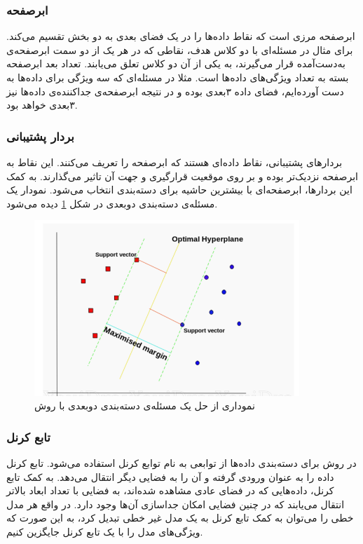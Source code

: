 \subsubsection{ابرصفحه}
ابرصفحه مرزی است که نقاط داده‌ها را در یک فضای بعدی به دو بخش تقسیم می‌کند. برای مثال در مسئله‌ای با دو کلاس هدف، نقاطی که در هر یک از دو سمت ابرصفحه‌ی به‌دست‌آمده قرار می‌گیرند، به یکی از آن دو کلاس تعلق می‌یابند. تعداد بعد ابرصفحه بسته به تعداد ویژگی‌های داده‌ها است. مثلا در مسئله‌ای که سه ویژگی برای داده‌ها به دست آورده‌ایم، فضای داده ۳بعدی بوده و در نتیجه ابرصفحه‌ی جداکننده‌ی داده‌ها نیز ۳بعدی خواهد بود.

\subsubsection{بردار پشتیبانی}
بردارهای پشتیبانی، نقاط داده‌ای هستند که ابرصفحه را تعریف می‌کنند. این نقاط به ابرصفحه نزدیک‌تر بوده و بر روی موقعیت قرارگیری و جهت آن تاثیر می‌گذارند. به کمک این بردارها، ابرصفحه‌ای با بیشترین حاشیه برای دسته‌بندی انتخاب می‌شود\cite{SVM}. نمودار یک مسئله‌ی دسته‌بندی دوبعدی در شکل \ref{fig:SVMClassification} دیده می‌شود.

\begin{figure}
\centering
\includegraphics[width=10cm]{Figures/svmMargin.png}
\caption{ نموداری از حل یک مسئله‌ی دسته‌بندی دوبعدی با روش \cite{SVM}}
\label{fig:SVMClassification}
\end{figure}
 

\subsubsection{ تابع کرنل}
در روش  برای دسته‌بندی داده‌ها از توابعی به نام توابع کرنل استفاده می‌شود. تابع کرنل داده را به عنوان ورودی گرفته و آن را به فضایی دیگر انتقال می‌دهد. به کمک تابع کرنل، داده‌هایی که در فضای عادی مشاهده شده‌اند، به فضایی با تعداد ابعاد بالاتر انتقال می‌یابند که در چنین فضایی امکان جداسازی آن‌ها وجود دارد. در واقع هر مدل خطی را می‌توان به کمک تابع کرنل به یک مدل غیر خطی تبدیل کرد، به این صورت که ویژگی‌های مدل را با یک تابع کرنل جایگزین کنیم. 


